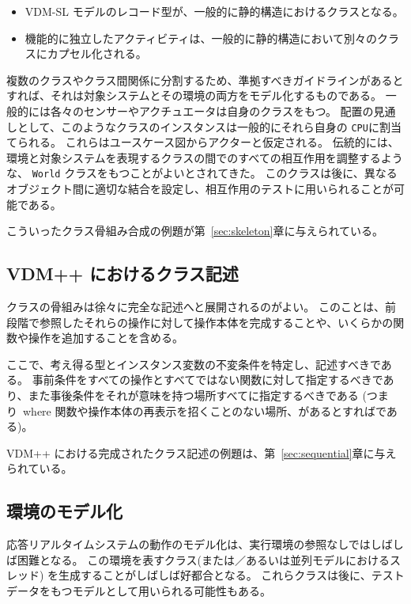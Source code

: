 \documentclass[\pformat,12pt]{jreport}
\begin{document}
\begin{itemize}
\item VDM-SL モデルのレコード型が、一般的に静的構造におけるクラスとなる。
\item 機能的に独立したアクティビティは、一般的に静的構造において別々のクラスにカプセル化される。
\end{itemize}

複数のクラスやクラス間関係に分割するため、準拠すべきガイドラインがあるとすれば、それは対象システムとその環境の両方をモデル化するものである。
一般的には各々のセンサーやアクチュエータは自身のクラスをもつ。
配置の見通しとして、このようなクラスのインスタンスは一般的にそれら自身の \texttt{CPU}に割当てられる。
これらはユースケース図からアクターと仮定される。
伝統的には、環境と対象システムを表現するクラスの間でのすべての相互作用を調整するような、 \texttt{World} クラスをもつことがよいとされてきた。
このクラスは後に、異なるオブジェクト間に適切な結合を設定し、相互作用のテストに用いられることが可能である。

こういったクラス骨組み合成の例題が第~\ref{sec:skeleton}章に与えられている。

\subsection{VDM++ におけるクラス記述}

クラスの骨組みは徐々に完全な記述へと展開されるのがよい。
このことは、前段階で参照したそれらの操作に対して操作本体を完成することや、いくらかの関数や操作を追加することを含める。

ここで、考え得る型とインスタンス変数の不変条件を特定し、記述すべきである。
事前条件をすべての操作とすべてではない関数に対して指定するべきであり、また事後条件をそれが意味を持つ場所すべてに指定するべきである (つまり\ where 関数や操作本体の再表示を招くことのない場所、があるとすればである)。

VDM++ における完成されたクラス記述の例題は、第~\ref{sec:sequential}章に与えられている。

\subsection{環境のモデル化}

応答リアルタイムシステムの動作のモデル化は、実行環境の参照なしではしばしば困難となる。
この環境を表すクラス(または／あるいは並列モデルにおけるスレッド) を生成することがしばしば好都合となる。
これらクラスは後に、テストデータをもつモデルとして用いられる可能性もある。
\end{document}
